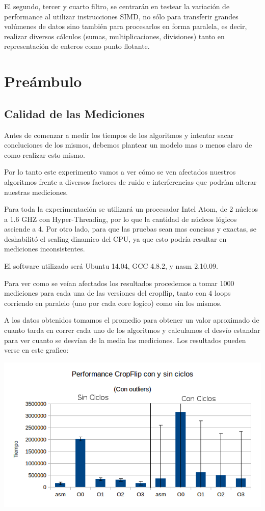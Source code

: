 \documentclass[a4paper]{article}
\begin{document}
El segundo, tercer y cuarto filtro, se centrarán en testear la variación de performance al utilizar instrucciones SIMD, no sólo para transferir grandes volúmenes de datos sino también para procesarlos en forma paralela, es decir, realizar diversos cálculos (sumas, multiplicaciones, divisiones) tanto en representación de enteros como punto flotante.

\newpage
\section{Preámbulo}

\subsection{Calidad de las Mediciones}

Antes de comenzar a medir los tiempos de los algoritmos y intentar sacar concluciones de los mismos, debemos plantear un modelo mas o menos claro de como realizar esto mismo.  

Por lo tanto este experimento vamos a ver cómo se ven afectados nuestros algoritmos frente a diversos factores de ruido e interferencias que podrían alterar nuestras mediciones.

Para toda la experimentación se utilizará un procesador Intel Atom, de 2 núcleos a 1.6 GHZ con Hyper-Threading, por lo que la cantidad de núcleos lógicos asciende a 4. Por otro lado, para que las pruebas sean mas concisas y exactas, se deshabilitó el scaling dinamico del CPU, ya que esto podría resultar en mediciones inconsistentes. 

El software utilizado será Ubuntu 14.04, GCC 4.8.2, y nasm 2.10.09.

Para ver como se veían afectados los resultados procedemos a tomar 1000 mediciones para cada una de las versiones del cropflip, tanto con 4 loops corriendo en paralelo (uno por cada core logico) como sin los mismos.

A los datos obtenidos tomamos el promedio para obtener un valor aproximado de cuanto tarda en correr cada uno de los algoritmos y calculamos el desvío estandar para ver cuanto se desvían de la media las mediciones. Los resultados pueden verse en este grafico:

\begin{center}
  \includegraphics[scale=0.66]{Graficos1.4/1.3/perConOut.png}
\end{center}
\end{document}
